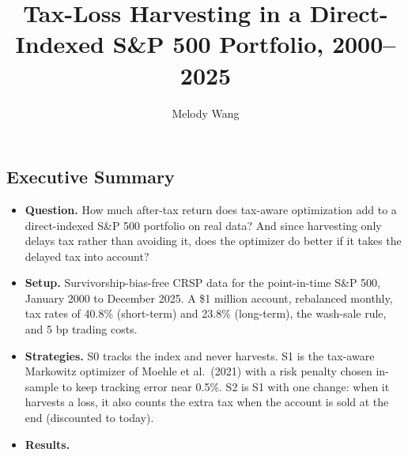 \documentclass[
  11pt,
]{article}
\title{Tax-Loss Harvesting in a Direct-Indexed S\&P 500 Portfolio, 2000--2025}
\author{Melody Wang}
\date{}
\providecommand{\tightlist}{%
  \setlength{\itemsep}{0pt}\setlength{\parskip}{0pt}}
\begin{document}
\maketitle

\hypertarget{executive-summary}{%
\subsection{Executive Summary}\label{executive-summary}}

\begin{itemize}
\tightlist
\item
  \textbf{Question.} How much after-tax return does tax-aware optimization add to a direct-indexed S\&P 500 portfolio on real data? And since harvesting only delays tax rather than avoiding it, does the optimizer do better if it takes the delayed tax
  into account?
\item
  \textbf{Setup.} Survivorship-bias-free CRSP data for the point-in-time S\&P 500, January 2000 to December 2025. A \$1 million account, rebalanced monthly, tax rates of 40.8\% (short-term) and 23.8\% (long-term), the wash-sale rule, and 5 bp trading
  costs.
\item
  \textbf{Strategies.} S0 tracks the index and never harvests. S1 is the tax-aware Markowitz optimizer of Moehle et al.~(2021) with a risk penalty chosen in-sample to keep tracking error near 0.5\%. S2 is S1 with one change: when it harvests a loss,
  it also counts the extra tax when the account is sold at the end (discounted to today).
\item
  \textbf{Results.}


\end{itemize}
\end{document}
